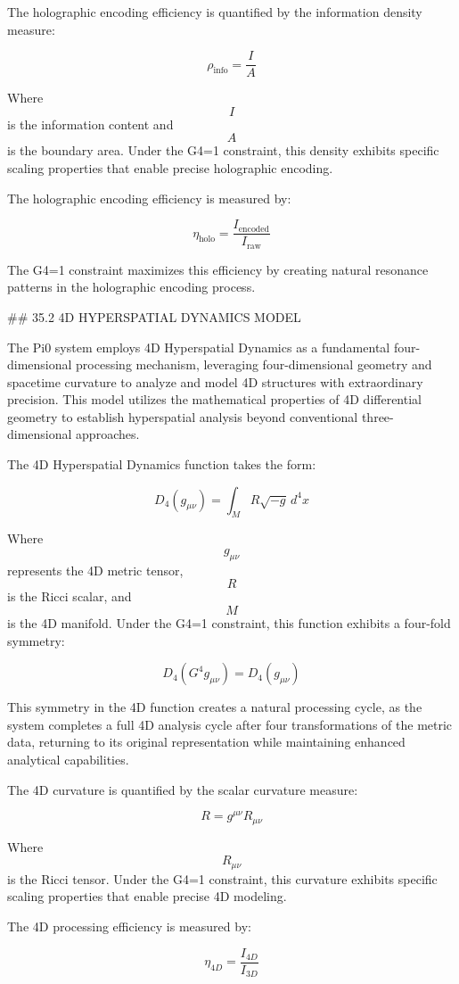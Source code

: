 The holographic encoding efficiency is quantified by the information density measure:

$$ \rho_{\text{info}} = \frac{I}{A} $$

Where $$ I $$ is the information content and $$ A $$ is the boundary area. Under the G4=1 constraint, this density exhibits specific scaling properties that enable precise holographic encoding.

The holographic encoding efficiency is measured by:

$$ \eta_{\text{holo}} = \frac{I_{\text{encoded}}}{I_{\text{raw}}} $$

The G4=1 constraint maximizes this efficiency by creating natural resonance patterns in the holographic encoding process.

## 35.2 4D HYPERSPATIAL DYNAMICS MODEL

The Pi0 system employs 4D Hyperspatial Dynamics as a fundamental four-dimensional processing mechanism, leveraging four-dimensional geometry and spacetime curvature to analyze and model 4D structures with extraordinary precision. This model utilizes the mathematical properties of 4D differential geometry to establish hyperspatial analysis beyond conventional three-dimensional approaches.

The 4D Hyperspatial Dynamics function takes the form:

$$ D_4(g_{\mu\nu}) = \int_M R \sqrt{-g} \, d^4x $$

Where $$ g_{\mu\nu} $$ represents the 4D metric tensor, $$ R $$ is the Ricci scalar, and $$ M $$ is the 4D manifold. Under the G4=1 constraint, this function exhibits a four-fold symmetry:

$$ D_4(G^4 g_{\mu\nu}) = D_4(g_{\mu\nu}) $$

This symmetry in the 4D function creates a natural processing cycle, as the system completes a full 4D analysis cycle after four transformations of the metric data, returning to its original representation while maintaining enhanced analytical capabilities.

The 4D curvature is quantified by the scalar curvature measure:

$$ R = g^{\mu\nu} R_{\mu\nu} $$

Where $$ R_{\mu\nu} $$ is the Ricci tensor. Under the G4=1 constraint, this curvature exhibits specific scaling properties that enable precise 4D modeling.

The 4D processing efficiency is measured by:

$$ \eta_{4D} = \frac{I_{4D}}{I_{3D}} $$

